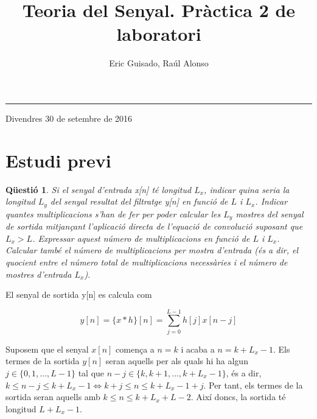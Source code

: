 \documentclass[11pt,a4]{article}
\title{Teoria del Senyal. Pràctica 2 de laboratori}
\author{Eric Guisado, Raúl Alonso}
\numberwithin{equation}{section}
\theoremstyle{thmstyle}
\theoremstyle{thmstyle}
\theoremstyle{thmstyle}
\theoremstyle{thmstyle}
\theoremstyle{thmstyle}
\theoremstyle{thmstyle}
\newtheorem{question}{Qüestió}
\theoremstyle{thmstyle}
\begin{document}

\thispagestyle{empty}

\noindent
{\bf \LARGE \thetitle}

\noindent
\rule{\textwidth}{1pt}

\vspace{15pt}

\noindent
{\Large \theauthor}
\vspace{15pt}

\noindent
{\large Divendres 30 de setembre de 2016}
\vspace{15pt}

\tableofcontents

\section{Estudi previ}
\begin{question}
Si el senyal d’entrada x[n] té longitud $L_x$, indicar quina seria la longitud $L_y$ del senyal resultat del filtratge y[n] en funció de $L$ i $L_x$. Indicar quantes multiplicacions s’han de fer per poder calcular les $L_y$ mostres del senyal de sortida mitjançant l’aplicació directa de l’equació de convolució suposant que $L_x > L$. Expressar aquest número de multiplicacions en funció de $L$ i $L_x$. Calcular també el número de multiplicacions per mostra d’entrada (és a dir, el quocient entre el número total de multiplicacions necessàries i el número de mostres d’entrada $L_x$).
\end{question}

El senyal de sortida y[n] es calcula com 

$$
y[n]=\lbrace x\ast h\rbrace[n]=\sum_{j=0}^{L-1} h[j]x[n-j]
$$

Suposem que el senyal $x[n]$ comença a $n=k$ i acaba a $n=k+L_x-1$. Els termes de la sortida $y[n]$ seran aquells per als quals hi ha algun $j\in\lbrace 0, 1, ..., L-1\rbrace$ tal que $n-j\in \lbrace k, k+1, ..., k+L_x-1\rbrace$, és a dir, $k\leqslant n-j \leqslant k+L_x-1 \Longleftrightarrow k+j\leqslant n \leqslant k+L_x-1+j$. Per tant, els termes de la sortida seran aquells amb $k\leqslant n \leq k+L_x+L-2$. Així doncs, la sortida té longitud $L+L_x-1$.
\end{document}
